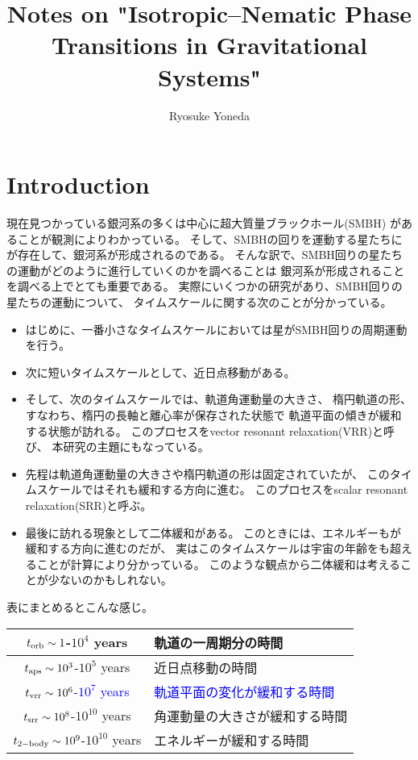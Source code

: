 \documentclass[10pt, pre, twocolumn, showpacs, aps]{revtex4-1}
\newcommand{\blue}[1]{\textcolor{blue}{#1}}
\begin{document}
\title{Notes on "Isotropic--Nematic Phase Transitions in Gravitational Systems"}
\author{Ryosuke Yoneda}
\maketitle

\section{Introduction}
現在見つかっている銀河系の多くは中心に超大質量ブラックホール(SMBH)
があることが観測によりわかっている。
そして、SMBHの回りを運動する星たちにが存在して、銀河系が形成されるのである。
そんな訳で、SMBH回りの星たちの運動がどのように進行していくのかを調べることは
銀河系が形成されることを調べる上でとても重要である。
実際にいくつかの研究があり、SMBH回りの星たちの運動について、
タイムスケールに関する次のことが分かっている。
\begin{itemize}
\item はじめに、一番小さなタイムスケールにおいては星がSMBH回りの周期運動を行う。
\item 次に短いタイムスケールとして、近日点移動がある。
\item そして、次のタイムスケールでは、軌道角運動量の大きさ、
楕円軌道の形、すなわち、楕円の長軸と離心率が保存された状態で
軌道平面の傾きが緩和する状態が訪れる。
このプロセスをvector resonant relaxation(VRR)と呼び、
本研究の主題にもなっている。
\item 先程は軌道角運動量の大きさや楕円軌道の形は固定されていたが、	
このタイムスケールではそれも緩和する方向に進む。
このプロセスをscalar resonant relaxation(SRR)と呼ぶ。
\item 最後に訪れる現象として二体緩和がある。
このときには、エネルギーもが緩和する方向に進むのだが、
実はこのタイムスケールは宇宙の年齢をも超えることが計算により分かっている。
このような観点から二体緩和は考えることが少ないのかもしれない。	
\end{itemize}
表にまとめるとこんな感じ。
\begin{table}[H]
\begin{tabular}{|c|l|}\hline
	$t_{\rm orb}\sim1$-$10^4$ years & 軌道の一周期分の時間\\ \hline
	$t_{\rm aps}\sim10^3$-$10^5$ years & 近日点移動の時間\\ \hline
	\blue{$t_{\rm vrr}\sim10^6$-$10^7$ years} & \blue{軌道平面の変化が緩和する時間}\\ \hline
	$t_{\rm srr}\sim10^8$-$10^{10}$ years & 角運動量の大きさが緩和する時間\\ \hline
	$t_{\rm 2-body}\sim10^9$-$10^{10}$ years & エネルギーが緩和する時間\\ \hline
\end{tabular}
\end{table}
\end{document}

